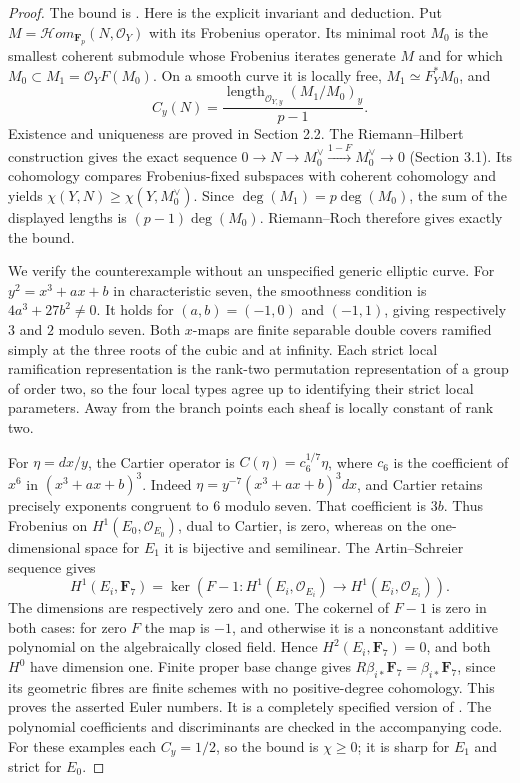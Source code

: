 \begin{proof}
The bound is \cite[Theorem 1.0.7 and Corollary 3.1.18]{BMiller2010}.
Here is the explicit invariant and deduction. Put
$M=\mathcal Hom_{\mathbf F_p}(N,\mathcal O_Y)$ with its Frobenius
operator. Its minimal root $M_0$ is the smallest coherent submodule
whose Frobenius iterates generate $M$ and for which
$M_0\subset M_1=\mathcal O_Y F(M_0)$.
On a smooth curve it is locally free, $M_1\simeq F_Y^*M_0$, and
\[
 C_y(N)=\frac{\operatorname{length}_{\mathcal O_{Y,y}}
                (M_1/M_0)_y}{p-1}.
\]
Existence and uniqueness are proved in Section 2.2. The
Riemann--Hilbert construction gives the exact sequence
$0\to N\to M_0^\vee\xrightarrow{1-F}M_0^\vee\to0$
(Section 3.1). Its cohomology compares Frobenius-fixed subspaces with
coherent cohomology and yields
$\chi(Y,N)\ge\chi(Y,M_0^\vee)$.
Since $\deg(M_1)=p\deg(M_0)$, the sum of the displayed lengths is
$(p-1)\deg(M_0)$. Riemann--Roch therefore gives exactly the bound.

We verify the counterexample without an unspecified generic elliptic
curve. For $y^2=x^3+ax+b$ in characteristic seven, the smoothness
condition is $4a^3+27b^2\ne0$. It holds for $(a,b)=(-1,0)$ and
$(-1,1)$, giving respectively $3$ and $2$ modulo seven. Both $x$-maps
are finite separable double covers ramified simply at the three roots
of the cubic and at infinity. Each strict local ramification
representation is the rank-two permutation representation of a group
of order two, so the four local types agree up to identifying their
strict local parameters. Away from the branch points each sheaf is
locally constant of rank two.

For $\eta=dx/y$, the Cartier operator is
$C(\eta)=c_6^{1/7}\eta$, where $c_6$ is the coefficient of $x^6$ in
$(x^3+ax+b)^3$. Indeed
$\eta=y^{-7}(x^3+ax+b)^3dx$, and Cartier retains precisely exponents
congruent to $6$ modulo seven. That coefficient is $3b$.
Thus Frobenius on $H^1(E_0,\mathcal O_{E_0})$, dual to Cartier,
is zero, whereas on the one-dimensional space for $E_1$ it is
bijective and semilinear. The Artin--Schreier sequence gives
\[
 H^1(E_i,\mathbf F_7)=
 \ker(F-1:H^1(E_i,\mathcal O_{E_i})\to H^1(E_i,\mathcal O_{E_i})).
\]
The dimensions are respectively zero and one. The cokernel of $F-1$
is zero in both cases: for zero $F$ the map is $-1$, and otherwise
it is a nonconstant additive polynomial on the algebraically closed
field. Hence $H^2(E_i,\mathbf F_7)=0$, and both $H^0$ have dimension
one. Finite proper base change gives
$R\beta_{i*}\mathbf F_7=\beta_{i*}\mathbf F_7$, since its geometric
fibres are finite schemes with no positive-degree cohomology.
This proves the asserted Euler numbers. It is a completely specified
version of \cite[Example 3.2.9]{BMiller2010}. The polynomial
coefficients and discriminants are checked in the accompanying code.
For these examples each $C_y=1/2$, so the bound is $\chi\ge0$;
it is sharp for $E_1$ and strict for $E_0$.
\end{proof}

